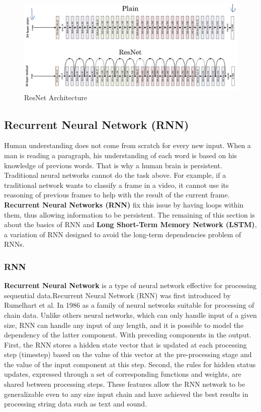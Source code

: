 \begin{center}
  \begin{figure}[H]
  \centering
  \includegraphics[width=1\columnwidth]{images/chap2/ResNet_Plain_Vs_Res.png}
  \caption{ResNet Architecture}
  \label{chap2:WSP}
  \end{figure}
\end{center}
\subsection{Recurrent Neural Network (RNN)}
Human understanding does not come from scratch for every new input. When a man is reading a paragraph, his understanding of each word is based on his knowledge of previous words. That is why a human brain is persistent.\\
Traditional neural networks cannot do the task above. For example, if a traditional network wants to classify a frame in a video, it cannot use its reasoning of previous frames to help with the result of the current frame.\\
\textbf{Recurrent Neural Networks (RNN)} fix this issue by having loops within them, thus allowing information to be persistent. The remaining of this section is about the basics of RNN and \textbf{Long Short-Term Memory Network (LSTM)}, a variation of RNN designed to avoid the long-term dependencies problem of RNNs.


\subsubsection{RNN}
\textbf{Recurrent Neural Network} is a type of neural network effective for processing sequential data.Recurrent Neural Network (RNN) was first introduced by Rumelhart et al. In 1986 as a family of neural networks suitable for processing of chain data. Unlike others neural networks, which can only handle input of a given size, RNN can handle any input of any length, and it is possible to model the dependency of the latter component. With preceding components in the output. First, the RNN stores a hidden state vector that is updated at each processing step (timestep) based on the value of this vector at the pre-processing stage and the value of the input component at this step. Second, the rules for hidden status updates, expressed through a set of corresponding functions and weights, are shared between processing steps. These features allow the RNN network to be generalizable even to any size input chain and have achieved the best results in processing string data such as text and sound.

